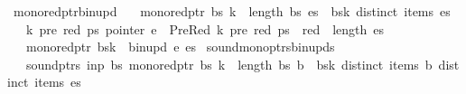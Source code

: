 \begin{isabellebody}
\isadelimproof
%
\endisadelimproof
%
\isatagproof
%
\endisatagproof
{\isafoldproof}%
%
\isadelimproof
\isanewline
%
\endisadelimproof
{}\isamarkupfalse%
\ mono{\isacharunderscore}{\kern0pt}red{\isacharunderscore}{\kern0pt}ptr{\isacharunderscore}{\kern0pt}bin{\isacharunderscore}{\kern0pt}upd{\isacharcolon}{\kern0pt}\isanewline
\ \ \ {\isachardoublequoteopen}mono{\isacharunderscore}{\kern0pt}red{\isacharunderscore}{\kern0pt}ptr\ bs{\isachardoublequoteclose}\ {\isachardoublequoteopen}k\ {\isacharless}{\kern0pt}\ length\ bs{\isachardoublequoteclose}\ {\isachardoublequoteopen}es\ {\isacharequal}{\kern0pt}\ bs{\isacharbang}{\kern0pt}k{\isachardoublequoteclose}\ {\isachardoublequoteopen}distinct\ {\isacharparenleft}{\kern0pt}items\ es{\isacharparenright}{\kern0pt}{\isachardoublequoteclose}\isanewline
\ \ \ {\isachardoublequoteopen}{\isasymforall}k{\isacharprime}{\kern0pt}\ pre\ red\ ps{\isachardot}{\kern0pt}\ pointer\ e\ {\isacharequal}{\kern0pt}\ PreRed\ {\isacharparenleft}{\kern0pt}k{\isacharprime}{\kern0pt}{\isacharcomma}{\kern0pt}\ pre{\isacharcomma}{\kern0pt}\ red{\isacharparenright}{\kern0pt}\ ps\ {\isasymlongrightarrow}\ red\ {\isacharless}{\kern0pt}\ length\ es{\isachardoublequoteclose}\isanewline
\ \ \ {\isachardoublequoteopen}mono{\isacharunderscore}{\kern0pt}red{\isacharunderscore}{\kern0pt}ptr\ {\isacharparenleft}{\kern0pt}bs{\isacharbrackleft}{\kern0pt}k\ {\isacharcolon}{\kern0pt}{\isacharequal}{\kern0pt}\ bin{\isacharunderscore}{\kern0pt}upd\ e\ es{\isacharbrackright}{\kern0pt}{\isacharparenright}{\kern0pt}{\isachardoublequoteclose}%
\isadelimproof
%
\endisadelimproof
%
\isatagproof
%
\endisatagproof
{\isafoldproof}%
%
\isadelimproof
\isanewline
%
\endisadelimproof
{}\isamarkupfalse%
\ sound{\isacharunderscore}{\kern0pt}mono{\isacharunderscore}{\kern0pt}ptrs{\isacharunderscore}{\kern0pt}bin{\isacharunderscore}{\kern0pt}upds{\isacharcolon}{\kern0pt}\isanewline
\ \ \ {\isachardoublequoteopen}sound{\isacharunderscore}{\kern0pt}ptrs\ inp\ bs{\isachardoublequoteclose}\ {\isachardoublequoteopen}mono{\isacharunderscore}{\kern0pt}red{\isacharunderscore}{\kern0pt}ptr\ bs{\isachardoublequoteclose}\ {\isachardoublequoteopen}k\ {\isacharless}{\kern0pt}\ length\ bs{\isachardoublequoteclose}\ {\isachardoublequoteopen}b\ {\isacharequal}{\kern0pt}\ bs{\isacharbang}{\kern0pt}k{\isachardoublequoteclose}\ {\isachardoublequoteopen}distinct\ {\isacharparenleft}{\kern0pt}items\ b{\isacharparenright}{\kern0pt}{\isachardoublequoteclose}\ {\isachardoublequoteopen}distinct\ {\isacharparenleft}{\kern0pt}items\ es{\isacharparenright}{\kern0pt}{\isachardoublequoteclose}\isanewline

\end{isabellebody}
